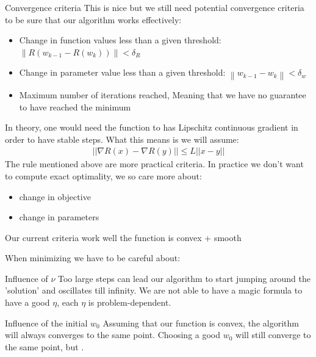 \begin{parag}{Convergence criteria}
    This is nice but we still need potential convergence criteria to be sure that our algorithm works effectively:
	\begin{itemize}
	\item Change in function values less than a given threshold: $\left\|R\left(w_{k-1} - R\left(w_k\right)\right)\right\| < \delta_R$
	\item Change in parameter value less than a given threshold: $\left\|w_{k-1} - w_k\right\| < \delta_w$
	\item Maximum number of iterations reached, Meaning that we have no guarantee to have reached the minimum
	\end{itemize}
	\begin{framedremark}
	In theory, one would need the function to has Lipschitz continuous gradient  in order to have stable steps. What this means is we will assume:
	\begin{align*} 
		|| \nabla R\left(x\right) - \nabla R\left(y\right)|| \leq L||x - y||
	\end{align*}
	The rule mentioned above are more practical criteria. In practice we don't want to compute exact optimality, we so care more about:
	\begin{itemize}
		\item change in objective
		\item change in parameters
	\end{itemize}
	Our current criteria work well  the function is convex + smooth
	\end{framedremark}
	When minimizing we have to be careful about:
	\begin{subparag}{Influence of $\nu$}
	    Too large steps can lead our algorithm to start jumping around the 'solution' and oscillates till infinity. We are not able to have a magic formula to have a good $\eta$, each $\eta$ is problem-dependent.
	\end{subparag}
	\begin{subparag}{Influence of the initial $w_0$}
		Assuming that our function is convex, the algorithm will always converges to the same point. Choosing a good $w_0$ will still converge to the same point, but .
	\end{subparag}
\end{parag}

